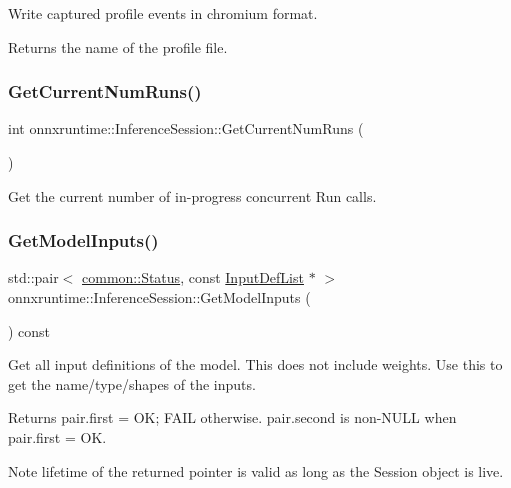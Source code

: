 Write captured profile events in chromium format. \begin{DoxyReturn}{Returns}
the name of the profile file. 
\end{DoxyReturn}
\mbox{\label{classonnxruntime_1_1InferenceSession_a9dbfd5df60f36c82833248db96dbe8fc}} 
\subsubsection{\texorpdfstring{Get\+Current\+Num\+Runs()}{GetCurrentNumRuns()}}
{\footnotesize\ttfamily int onnxruntime\+::\+Inference\+Session\+::\+Get\+Current\+Num\+Runs (\begin{DoxyParamCaption}{ }\end{DoxyParamCaption})}

Get the current number of in-\/progress concurrent Run calls. \mbox{\label{classonnxruntime_1_1InferenceSession_ae8519d7cd45b56ba6bf83c13757cd55e}} 
\subsubsection{\texorpdfstring{Get\+Model\+Inputs()}{GetModelInputs()}}
{\footnotesize\ttfamily std\+::pair$<$ \mbox{\hyperlink{classonnxruntime_1_1common_1_1Status}{common\+::\+Status}}, const \mbox{\hyperlink{namespaceonnxruntime_ab363b0109a9af018fb3e355aac00a360}{Input\+Def\+List}} $\ast$ $>$ onnxruntime\+::\+Inference\+Session\+::\+Get\+Model\+Inputs (\begin{DoxyParamCaption}{ }\end{DoxyParamCaption}) const}

Get all input definitions of the model. This does not include weights. Use this to get the name/type/shapes of the inputs. \begin{DoxyReturn}{Returns}
pair.\+first = OK; F\+A\+IL otherwise. pair.\+second is non-\/\+N\+U\+LL when pair.\+first = OK. 
\end{DoxyReturn}
\begin{DoxyNote}{Note}
lifetime of the returned pointer is valid as long as the Session object is live. 
\end{DoxyNote}
\mbox{\label{classonnxruntime_1_1InferenceSession_a1ef429e9018e8bc9989c0f0c59330c87}} 
